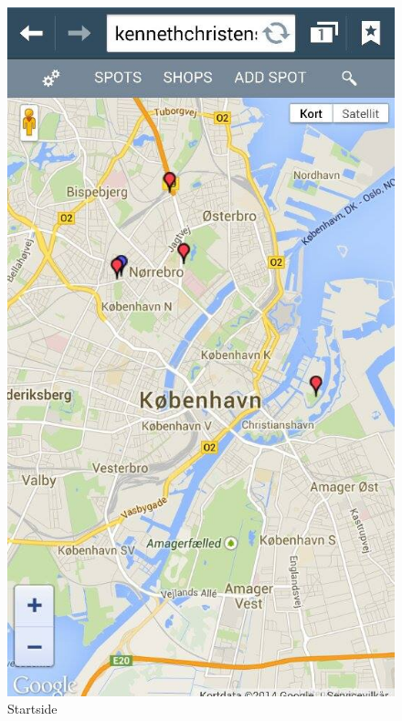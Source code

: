 \documentclass[12pt]{article}
\begin{document}
\begin{figure}[ht]
\begin{minipage}[b]{0.45\linewidth}
\centering
\includegraphics[width=\textwidth]{mobil1}
\caption{Startside}
\label{fig:figure1}
\end{minipage}
\hspace{0.5cm}
\begin{minipage}[b]{0.45\linewidth}
\centering

\end{minipage}
\end{figure}
\end{document}
